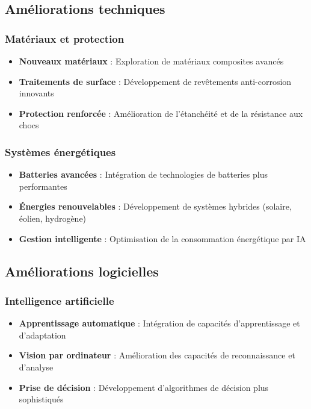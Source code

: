 {\subsection{Améliorations techniques}
\subsubsection{Matériaux et protection}
\begin{itemize}
    \item \textbf{Nouveaux matériaux} : Exploration de matériaux composites avancés
    \item \textbf{Traitements de surface} : Développement de revêtements anti-corrosion innovants
    \item \textbf{Protection renforcée} : Amélioration de l'étanchéité et de la résistance aux chocs
\end{itemize}

\subsubsection{Systèmes énergétiques}
\begin{itemize}
    \item \textbf{Batteries avancées} : Intégration de technologies de batteries plus performantes
    \item \textbf{Énergies renouvelables} : Développement de systèmes hybrides (solaire, éolien, hydrogène)
    \item \textbf{Gestion intelligente} : Optimisation de la consommation énergétique par IA
\end{itemize}

\subsection{Améliorations logicielles}
\subsubsection{Intelligence artificielle}
\begin{itemize}
    \item \textbf{Apprentissage automatique} : Intégration de capacités d'apprentissage et d'adaptation
    \item \textbf{Vision par ordinateur} : Amélioration des capacités de reconnaissance et d'analyse
    \item \textbf{Prise de décision} : Développement d'algorithmes de décision plus sophistiqués
\end{itemize}

}
